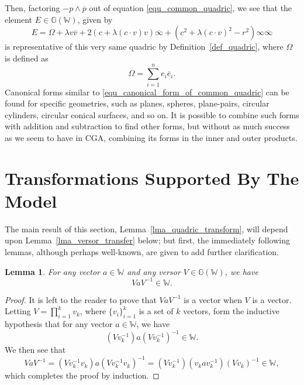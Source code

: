 \documentclass{birkjour}
\newtheorem{lem}[thm]{Lemma}
\theoremstyle{definition}
\theoremstyle{remark}
\numberwithin{equation}{section}
\newcommand{\G}{\mathbb{G}}
\newcommand{\W}{\mathbb{W}}
\newcommand{\nvai}{\infty}
\newcommand{\nvaib}{\overline{\infty}}
\begin{document}
Then, factoring $-p\wedge\overline{p}$ out of equation \eqref{equ_common_quadric}, we see that
the element $E\in\G(\W)$, given by
\begin{equation}\label{equ_canonical_form_of_common_quadric}
E=\Omega + \lambda v\overline{v}+2(c+\lambda(c\cdot v)v)\nvaib+
(c^2+\lambda (c\cdot v)^2-r^2)\nvai\nvaib
\end{equation}
is representative of this very same quadric by Definition~\ref{def_quadric},
where $\Omega$ is defined as
\begin{equation}
\Omega = \sum_{i=1}^n e_i\overline{e}_i.
\end{equation}
Canonical forms similar to \eqref{equ_canonical_form_of_common_quadric}
can be found for specific geometries, such as planes, spheres, plane-pairs,
circular cylinders, circular conical surfaces, and so on.  It is possible to combine
such forms with addition and subtraction to find other forms, but without as much success as we
seem to have in CGA, combining its forms in the inner and outer products.

\section{Transformations Supported By The Model}

The main result of this section, Lemma~\ref{lma_quadric_transform},
will depend upon Lemma~\ref{lma_versor_transfer} below;
but first, the immediately following lemmas, although perhaps well-known, are given to add further clarification.

\begin{lem}\label{lem_versor_act_on_vector}
For any vector $a\in\W$ and any versor $V\in\G(\W)$, we have
\begin{equation}
VaV^{-1}\in\W.
\end{equation}
\end{lem}
\begin{proof}
It is left to the reader to prove that $VaV^{-1}$ is a vector when $V$ is a vector.
Letting $V=\prod_{i=1}^k v_k$, where $\{v_i\}_{i=1}^k$ is
a set of $k$ vectors, form the inductive hypothesis that for any vector $a\in\W$, we have
\begin{equation}
(Vv_k^{-1})a(Vv_k^{-1})^{-1}\in\W.
\end{equation}
We then see that
\begin{equation}
VaV^{-1} = (Vv_k^{-1}v_k)a(Vv_k^{-1}v_k)^{-1} = (Vv_k^{-1})(v_kav_k^{-1})(Vv_k)^{-1}\in\W,
\end{equation}
which completes the proof by induction.
\end{proof}
\end{document}
